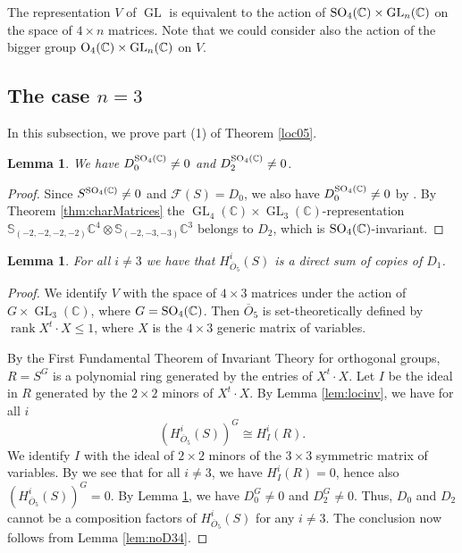 \documentclass[11pt,reqno]{amsart}
\newcommand{\oo}{\otimes}
\newcommand{\bS}{\mathbb{S}}
\newcommand{\tn}{\textnormal}
\newcommand{\C}{\mathbb{C}}
\newcommand{\GL}{\operatorname{GL}}
\newcommand{\mc}[1]{\mathcal{#1}}
\newcommand{\ol}[1]{\overline{#1}}
\newcommand{\op}[1]{\operatorname{#1}}
\newtheorem{lemma}[theorem]{Lemma}
\numberwithin{equation}{section}
\begin{document}
The representation $V$ of $\GL$ is equivalent to the action of $\tn{SO}_4(\C) \times \GL_n(\C)$ on the space of $4\times n$ matrices. Note that we could consider also the action of the bigger group $\tn{O}_4(\C) \times \GL_n(\C)$ on $V$. 

\subsection{The case $n=3$} In this subsection, we prove part (1)  of Theorem \ref{loc05}. 

\begin{lemma}\label{lem:D2inv}
We have $D_0^{\tn{SO}_4(\C)} \neq 0$ and $D_2^{\tn{SO}_4(\C)} \neq 0$.
\end{lemma}

\begin{proof}
Since $S^{\tn{SO}_4(\C)} \neq 0$ and $\mc{F}(S)=D_0$, we also have $D_0^{\tn{SO}_4(\C)} \neq 0$ by \cite[(4.14)]{lHorincz2019categories}. By Theorem \ref{thm:charMatrices} the $\GL_4(\C)\times \GL_3(\C)$-representation $\bS_{(-2,-2,-2,-2)}\C^4\oo \bS_{(-2,-3,-3)}\C^3$ belongs to $D_2$, which is $\tn{SO}_4(\C)$-invariant. 
\end{proof}


\begin{lemma}\label{eq:locO5}
For all $i\neq 3$ we have that $H^i_{\ol{O}_5}(S)$ is a direct sum of copies of $D_1$. %
\end{lemma}

\begin{proof}
 
We identify $V$ with the space of $4\times 3$ matrices under the action of $G\times \GL_3(\C)$, where $G=\tn{SO}_4(\C)$. Then $\ol{O}_5$ is set-theoretically defined by  $\op{rank} X^t \cdot X \leq 1$, where $X$ is the $4\times 3$ generic matrix of variables. 

By the First Fundamental Theorem of Invariant Theory for orthogonal groups, $R=S^G$ is a polynomial ring generated by the entries of $X^t \cdot X$. Let $I$ be the ideal in $R$ generated by the $2\times 2$ minors of $X^t \cdot X$. By Lemma \ref{lem:locinv}, we have for all $i$
\[(H^i_{\ol{O}_5}(S))^G \cong H^i_{I}(R).\]
We identify $I$ with the ideal of $2\times 2$ minors of the $3\times 3$ symmetric matrix of variables. By  \cite[(1.5)]{raicu2016ocal} we see that for all $i\neq 3$, we have $H^i_{I}(R)=0$, hence also $(H^i_{\ol{O}_5}(S))^G=0$. By Lemma \ref{lem:D2inv}, we have $D_0^G\neq 0$ and $D_2^G\neq 0$. Thus, $D_0$ and $D_2$ cannot be a composition factors of $H^i_{\ol{O}_5}(S)$ for any $i\neq 3$. The conclusion now follows from Lemma \ref{lem:noD34}.  
\end{proof}
\end{document}

